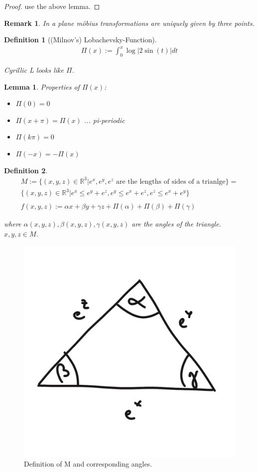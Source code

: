 \documentclass[]{article}
\newtheorem{lemma}{Lemma}
\newtheorem{definition}{Definition}
\newtheorem{remark}{Remark}
\begin{document}
\begin{proof}
	use the above lemma.
\end{proof}

\begin{remark}
	In a plane möbius transformations are uniquely given by three points.
\end{remark}

\begin{definition}[(Milnov's) Lobachevsky-Function]
	\begin{align*}
		 \Pi(x) := \int_{0}^{x} \log |2\sin(t)| dt
	\end{align*}
	
	Cyrillic L looks like $\Pi$.
\end{definition}

\begin{lemma}
	Properties of $\Pi(x)$:
	\begin{itemize}
		\item $\Pi(0) = 0$
		\item $\Pi(x+\pi) = \Pi(x)$ ... pi-periodic
		\item $\Pi(k\pi) = 0$
		\item $\Pi(-x) = -\Pi(x)$
	\end{itemize}
\end{lemma}

\begin{definition}
	\begin{align*}
		M := \{(x,y,z) \in \mathbb{R}^3 | e^x, e^y, e^z \text{ are the lengths of sides of a trianlge}\} =\\
		\{(x,y,z) \in \mathbb{R}^3| e^x \leq e^y + e^z, e^y \leq e^x + e^z, e^z \leq e^x + e^y\}\\
		\\
		f(x,y,z) := \alpha x + \beta y + \gamma z + \Pi(\alpha) + \Pi(\beta) + \Pi(\gamma)
	\end{align*}
	
	where $\alpha(x,y,z), \beta(x,y,z), \gamma(x,y,z)$ are the angles of the triangle. $x,y,z \in M$.
\end{definition}

\begin{figure}[h!]
	\centering
	\includegraphics[width=0.3\linewidth]{figures/definition_M}
	\caption{Definition of M and corresponding angles.}
	\label{fig:definition_M}
\end{figure}
\end{document}
